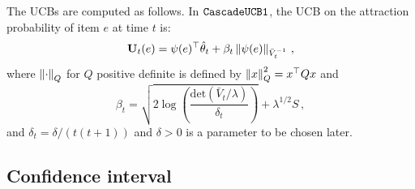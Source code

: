 %
The UCBs are computed as follows. In ${\tt CascadeUCB1}$, the UCB on the attraction probability of item $e$ at time $t$ is:
\begin{align*}
  \mathbf{U}_t(e) = \psi(e)^\top \hat{\mathbf{\theta}}_t + \beta_t \left\|\psi(e) \right\|_{\bar{V}_t^{-1}}\,,
\end{align*}
where $\left\|\cdot\right\|_Q$ for $Q$ positive definite is defined by
$\left\|x\right\|^2_Q  = x^\top Q x$ and
\[
\beta_t = \sqrt{2 \log\left(\frac{\mathrm{det}(\bar{V}_t/\lambda)}{\delta_t}\right)} + \lambda^{1/2} S\,,
\]
and $\delta_t = \delta/(t(t+1))$ and $\delta>0$ is a parameter to be chosen later.

\subsection{Confidence interval}

